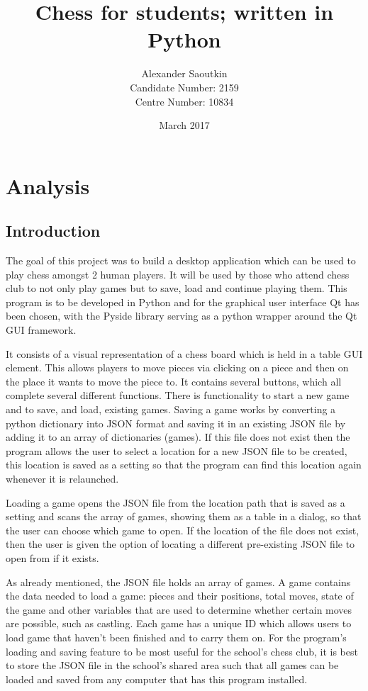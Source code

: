 \documentclass[twoside, 12pt]{report}
\title{Chess for students; written in Python}
\author{Alexander Saoutkin\\Candidate Number: 2159\\Centre Number: 10834}
\date{March 2017}
\begin{document}
\maketitle
\tableofcontents
\newpage
\chapter{Analysis}
\section{Introduction}
The goal of this project was to build a desktop application which can be used to play chess amongst 2 human players. It will be used by those who attend chess club to not only play games but to save, load and continue playing them. This program is to be developed in Python and for the graphical user interface Qt has been chosen, with the Pyside library serving as a python wrapper around the Qt GUI framework. 

It consists of a visual representation of a chess board which is held in a table GUI element. This allows players to move pieces via clicking on a piece and then on the place it wants to move the piece to. It contains several buttons, which all complete several different functions. There is functionality to start a new game and to save, and load, existing games. Saving a game works by converting a python dictionary into JSON format and saving it in an existing JSON file by adding it to an array of dictionaries (games). If this file does not exist then the program allows the user to select a location for a new JSON file to be created, this location is saved as a setting so that the program can find this location again whenever it is relaunched.
 
Loading a game opens the JSON file from the location path that is saved as a setting and scans the array of games, showing them as a table in a dialog, so that the user can choose which game to open. If the location of the file does not exist, then the user is given the option of locating a different pre-existing JSON file to open from if it exists.

As already mentioned, the JSON file holds an array of games. A game contains the data needed to load a game: pieces and their positions, total moves, state of the game and other variables that are used to determine whether certain moves are possible, such as castling. Each game has a unique ID which allows users to load game that haven't been finished and to carry them on. For the program's loading and saving feature to be most useful for the school's chess club, it is best to store the JSON file in the school's shared area such that all games can be loaded and saved from any computer that has this program installed.
\end{document}
